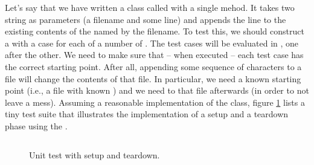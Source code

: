 Let's say that we have written a class called  with a single  mehod. It takes two string as parameters (a filename and some line) and appends the line to the existing contents of the  named by the filename. To test this, we should construct a  with a case for each of a number of . The test cases will be evaluated in , one after the other. We need to make sure that -- when executed -- each test case has the correct starting point. After all, appending some sequence of characters to a file will change the contents of that file. In particular, we need a known starting point (i.e., a file with known ) and we need to  that file afterwards (in order to not leave a mess). Assuming a reasonable implementation of the  class, figure \ref{fig:test:project:setupteardown:example} lists a tiny test suite that illustrates the implementation of a setup and a teardown phase using the .

\begin{figure}[tbp]
  \inputminted[highlightlines={12-17,19-23}, highlightcolor=yellow]{csharp}{../src/csharp/test/setupteardown/UnitTests/LoggerTest.cs}
  \caption{Unit test with setup and teardown.}
  \label{fig:test:project:setupteardown:example}
\end{figure}

